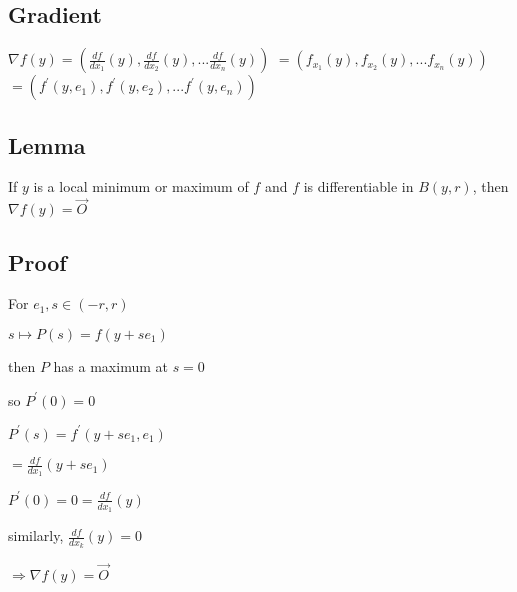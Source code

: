 \documentclass[12pt]{article}
\begin{document}
 \subsection{Gradient}
 $\nabla f(y) = (\frac{df}{dx_1}(y), \frac{df}{dx_2}(y),...\frac{df}{dx_n}(y))$
 \newline\indent\indent$= (f_{x_1}(y), f_{x_2}(y),...f_{x_n}(y))$
 \newline\indent\indent$= (f^\prime(y, e_1), f^\prime(y, e_2),...f^\prime(y, e_n))$
 \subsection{Lemma}
 If $y$ is a local minimum or maximum of $f$ and $f$ is differentiable in $B(y, r)$, then $\nabla f(y) = \vec{O}$
 \subsection{Proof}
 For $e_1, s\in (-r, r)$
 
 $s\mapsto P(s) = f(y +se_1)$
 
 then $P$ has a maximum at $s = 0$

 so $P^{'}(0) = 0$

 $P^{'}(s) = f^\prime (y+se_1, e_1)$

\indent\indent\indent$=\frac{df}{dx_1}(y+se_1)$

$P^\prime (0) = 0 = \frac{df}{dx_1}(y)$

similarly, $\frac{df}{dx_k}(y)=0$

$\Rightarrow\nabla f(y)=\vec{O}$
 
\end{document}
